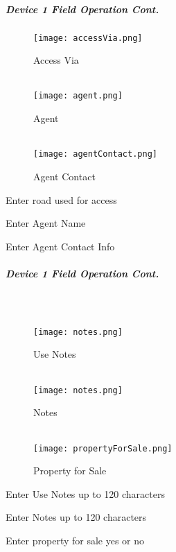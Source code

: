 \documentclass[class=article , crop=false, titlepage, twoside, multi={itemize, figure, verbatim}, float=false]{standalone}
\begin{document}
\clearpage
\subparagraph*{Device 1 Field Operation Cont.}
\begin{wrapfigure}{r}{0.5\textwidth}
\centering
\texttt{[image: accessVia.png]}
\caption {Access Via}
\vspace{.2in}
\HRule \\[.4cm] %
\vspace{.2in}
\texttt{[image: agent.png]}
\caption{Agent}
\vspace{.2in}
\HRule \\[.4cm] %
\vspace{.2in}
\texttt{[image: agentContact.png]}
\caption{Agent Contact}
\end{wrapfigure}
Enter road used for access\\
\vspace{2in}

\noindent Enter Agent Name\\
\vspace{2in}

\noindent Enter Agent Contact Info\\

\clearpage
\subparagraph*{Device 1 Field Operation Cont.}
\subparagraph*{\\}
\begin{wrapfigure}{r}{0.5\textwidth}
\centering
\texttt{[image: notes.png]}
\caption {Use Notes}
\vspace{.2in}
\HRule \\[.4cm] %
\vspace{.2in}
\texttt{[image: notes.png]}
\caption{Notes}
\vspace{.2in}
\HRule \\[.4cm] %
\vspace{.2in}
\texttt{[image: propertyForSale.png]}
\caption{Property for Sale}
\end{wrapfigure}
Enter  Use Notes up to 120 characters\\
\vspace{2in}

\noindent Enter Notes up to 120 characters\\
\vspace{2in}

\noindent Enter property for sale yes or no\\
\end{document}
